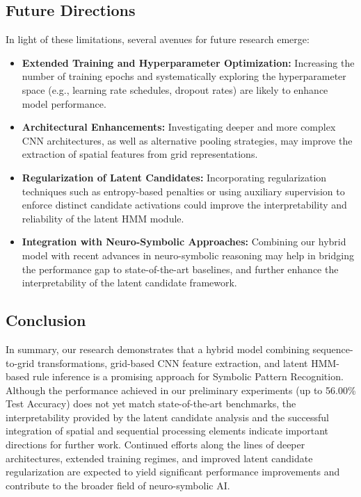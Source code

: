 \documentclass[11pt]{article}
\begin{document}
\subsection{Future Directions}
In light of these limitations, several avenues for future research emerge:
\begin{itemize}
    \item \textbf{Extended Training and Hyperparameter Optimization:} Increasing the number of training epochs and systematically exploring the hyperparameter space (e.g., learning rate schedules, dropout rates) are likely to enhance model performance.
    \item \textbf{Architectural Enhancements:} Investigating deeper and more complex CNN architectures, as well as alternative pooling strategies, may improve the extraction of spatial features from grid representations.
    \item \textbf{Regularization of Latent Candidates:} Incorporating regularization techniques such as entropy-based penalties or using auxiliary supervision to enforce distinct candidate activations could improve the interpretability and reliability of the latent HMM module.
    \item \textbf{Integration with Neuro-Symbolic Approaches:} Combining our hybrid model with recent advances in neuro-symbolic reasoning may help in bridging the performance gap to state-of-the-art baselines, and further enhance the interpretability of the latent candidate framework.
\end{itemize}

\subsection{Conclusion}
In summary, our research demonstrates that a hybrid model combining sequence-to-grid transformations, grid-based CNN feature extraction, and latent HMM-based rule inference is a promising approach for Symbolic Pattern Recognition. Although the performance achieved in our preliminary experiments (up to 56.00\% Test Accuracy) does not yet match state-of-the-art benchmarks, the interpretability provided by the latent candidate analysis and the successful integration of spatial and sequential processing elements indicate important directions for further work. Continued efforts along the lines of deeper architectures, extended training regimes, and improved latent candidate regularization are expected to yield significant performance improvements and contribute to the broader field of neuro-symbolic AI.



\end{document}
